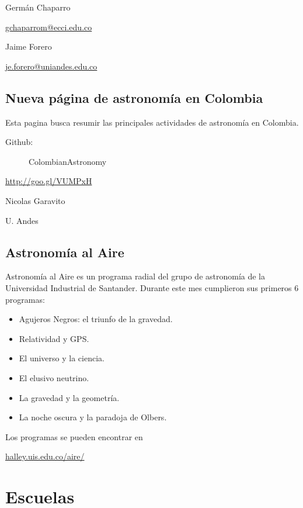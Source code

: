 \documentclass{book}
\begin{document}
\begin{flushright}
Germán Chaparro 

\url{gchaparrom@ecci.edu.co}

Jaime Forero 

\url{je.forero@uniandes.edu.co}
\end{flushright}


\subsection{Nueva página de astronomía en Colombia}
Esta pagina busca resumir las principales actividades de astronomía en Colombia. 
 
 \begin{description}
 \item[Github: ]ColombianAstronomy
 \end{description}
\begin{center}
\url{http://goo.gl/VUMPxH}
\end{center}
\begin{flushright}
Nicolas Garavito

U. Andes
\end{flushright}

\subsection{Astronomía al Aire}
Astronomía al Aire es un programa radial del grupo de astronomía de la Universidad Industrial de Santander. Durante este mes cumplieron sus primeros 6 programas: 
\begin{itemize}
\item Agujeros Negros: el triunfo de la gravedad.
\item Relatividad y GPS.
\item El universo y la ciencia.
\item El elusivo neutrino.
\item La gravedad y la geometría.
\item La noche oscura y la paradoja de Olbers.
\end{itemize}
Los programas se pueden encontrar en
\begin{center}
\url{halley.uis.edu.co/aire/}
\end{center}

       \section*{Escuelas}
\end{document}
